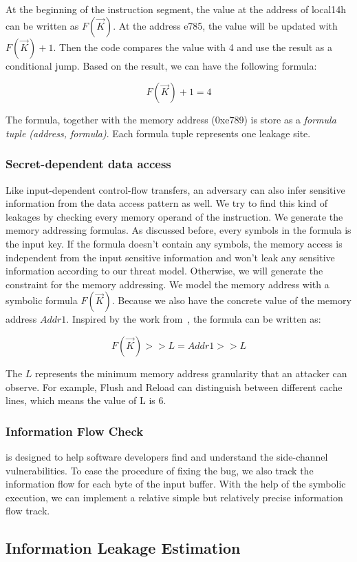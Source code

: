 At the beginning of the instruction segment, the value at the 
address of local14h can be written as $F(\vec{K})$. At the address e785, 
the value will be updated with $F(\vec{K})+1$. Then the code compares 
the value with 4 and use the result as a conditional jump. 
Based on the result, we can have the following formula:

$$F(\vec{K}) + 1 = 4$$

The formula, together with the memory address (0xe789) is store
as a \textit{formula tuple (address, formula)}. 
Each formula tuple represents one leakage site.

\subsubsection{Secret-dependent data access}
Like input-dependent control-flow transfers, an adversary can also infer 
sensitive information from the data access pattern as well. 
We try to find this kind of leakages by checking 
every memory operand of the instruction. We generate the memory addressing 
formulas. As discussed before, every symbols in the formula is the input key. 
If the formula doesn’t contain any symbols, the memory access is independent 
from the input sensitive information and won’t leak any sensitive information 
according to our threat model. Otherwise, we will generate the constraint for
the memory addressing. We model the memory address with a symbolic formula 
$F(\vec{K})$. 
Because we also have the concrete value of the memory address $Addr1$. 
Inspired by the work from~\cite{203878}, the formula can be written as:

$$F(\vec{K}) >> L = Addr1 >> L$$

The $L$ represents the minimum memory address granularity that an attacker 
can observe. For example, Flush and Reload can distinguish between different
cache lines, which means the value of L is 6.

\subsubsection{Information Flow Check}
\tool{} is designed to help software developers find and understand the 
side-channel vulnerabilities. To ease the procedure of fixing the bug,
we also track the information flow for each byte of the input
buffer. With the help of the symbolic execution, we can implement
a relative simple but relatively precise information flow track.


\subsection{Information Leakage Estimation}

